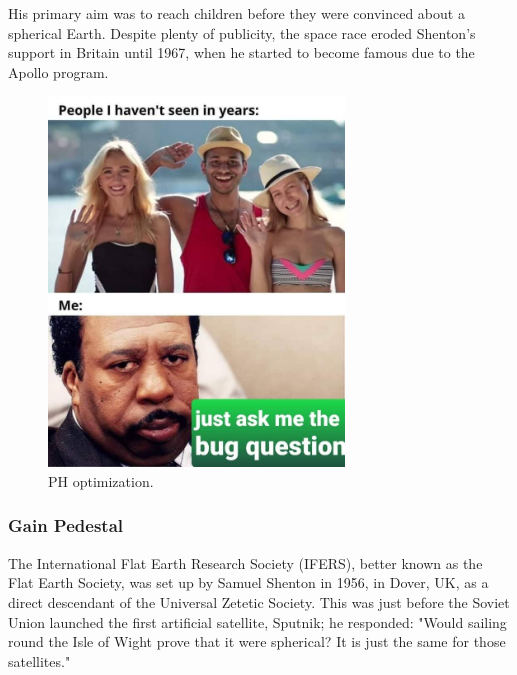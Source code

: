His primary aim was to reach children before they were convinced about a spherical Earth. Despite plenty of publicity, the space race eroded Shenton's support in Britain until 1967, when he started to become famous due to the Apollo program.
\begin{figure}[!h]
  \centering
  \includegraphics[width=0.7\textwidth]{../images/ch7/5}
  \caption[Ph Optimization.]{PH optimization.}\label{fig:vis_insp}
\end{figure}

\subsubsection{Gain Pedestal}
The International Flat Earth Research Society (IFERS), better known as the Flat Earth Society, was set up by Samuel Shenton in 1956, in Dover, UK, as a direct descendant of the Universal Zetetic Society. This was just before the Soviet Union launched the first artificial satellite, Sputnik; he responded: "Would sailing round the Isle of Wight prove that it were spherical? It is just the same for those satellites."

